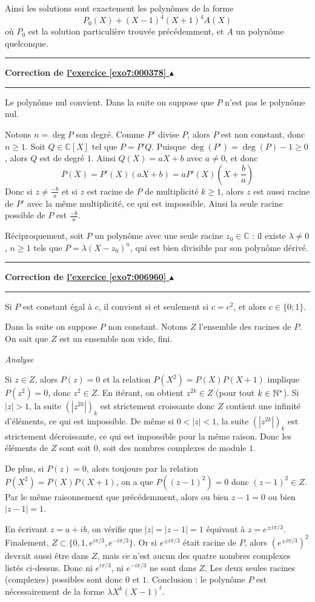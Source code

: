 \documentclass[11pt,a4paper]{article}
\newcommand{\Cc}{\mathbb{C}} \newcommand{\C}{\mathbb{C}}
\renewcommand{\ge}{\geqslant} \renewcommand{\geq}{\geqslant}
\newcounter{exo}
\newcommand{\correction}[1]{\hypertarget{cor7:#1}{}\label{cor7:#1}{\bf Correction de \hyperlink{exo7:#1}{l'exercice \ref{exo7:#1} $\blacktriangle$}}\vspace{1mm}\hrule\vspace{1mm}}
\newcommand{\fincorrection}{\vspace{1mm}\hrule\vspace*{7mm}}
\begin{document}
Ainsi les solutions sont exactement les polynômes de la forme
$$P_0(X)+(X-1)^4(X+1)^4A(X)$$
où $P_0$ est la solution particulière trouvée précédemment, et $A$ un polynôme quelconque.
\fincorrection
\correction{000378}
Le polynôme nul convient. Dans la suite on suppose que $P$ n'est pas le polynôme nul.

Notons $n = \deg P$ son degré. Comme $P'$ divise $P$, alors $P$ est non constant, 
donc $n\ge 1$. Soit $Q\in\Cc[X]$ tel que $P=P'Q$.
Puisque $\deg(P')=\deg(P)-1\ge 0$, alors $Q$ est de degré $1$.
Ainsi $Q(X)=aX+b$ avec $a\neq0$, et donc  
$$P(X)=P'(X)(aX+b)=aP'(X)(X+\frac{b}{a})$$
Donc si $z\not=\frac{-b}{a}$ et si $z$ est racine de $P$ de multiplicité $k \ge 1$, 
alors $z$ est aussi racine de $P'$ avec la même multiplicité, ce qui est impossible. 
Ainsi la seule racine possible de $P$ est $\frac{-b}{a}$.

Réciproquement, soit $P$ un polynôme avec une seule racine $z_0 \in \Cc$ : 
il existe $\lambda\not=0$, $n\ge 1$ tels que $P=\lambda(X-z_0)^n$, 
qui est bien divisible par son polynôme dérivé.
\fincorrection
\correction{006960}
Si $P$ est constant égal à $c$, il convient si et seulement si $c=c^2$,
et alors $c\in\{0;1\}$. 

Dans la suite on suppose $P$ non constant.
Notons $Z$ l'ensemble des racines de $P$. On sait que $Z$ est un ensemble non vide, fini.


\emph{Analyse}

Si $z\in Z$, alors $P(z)=0$ et la relation $P(X^2)=P(X)P(X+1)$ implique $P(z^2)=0$, donc $z^2\in Z$.
En itérant, on obtient $z^{2k}\in Z$ (pour tout $k\in\mathbb{N}^*$). 
Si $|z|>1$, la suite $(|z^{2k}|)_k$ est strictement croissante 
donc $Z$ contient une infinité d'éléments, ce qui est impossible. 
De même si $0<|z|<1$, la suite $(|z^{2k}|)_k$ est strictement décroissante, 
ce qui est impossible pour la même raison. 
Donc les éléments de $Z$ sont soit $0$, soit des nombres complexes de module $1$.

De plus, si $P(z)=0$, alors toujours par la relation $P(X^2)=P(X)P(X+1)$,
on a que $P((z-1)^2)=0$ donc $(z-1)^2\in Z$. Par le même raisonnement que précédemment,
alors ou bien $z-1=0$ ou bien $|z-1|=1$. 

En écrivant $z=a+ib$, on vérifie que $|z|=|z-1|=1$ équivaut à 
$z=e^{\pm i\pi/3}$. Finalement, $Z\subset\big\{0,1,e^{i\pi/3},e^{-i\pi/3}\big\}$. 
Or si $e^{\pm i\pi/3}$ était racine de $P$, alors $(e^{\pm i\pi/3})^2$ devrait aussi être dans $Z$, 
mais ce n'est aucun des quatre nombres complexes listés ci-dessus. 
Donc ni $e^{i\pi/3}$, ni $e^{-i\pi/3}$ ne sont dans $Z$. 
Les deux seules racines (complexes) possibles sont donc $0$ et $1$. 
Conclusion : le polynôme $P$ est nécessairement de la forme $\lambda X^k(X-1)^\ell$. 
\end{document}
